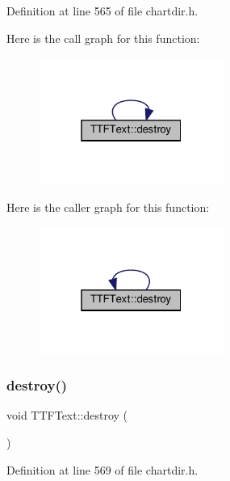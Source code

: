 Definition at line 565 of file chartdir.\+h.

Here is the call graph for this function\+:
\nopagebreak
\begin{figure}[H]
\begin{center}
\leavevmode
\includegraphics[width=172pt]{class_t_t_f_text_ad656abc050a6d082cf0f07fb5c519253_cgraph}
\end{center}
\end{figure}
Here is the caller graph for this function\+:
\nopagebreak
\begin{figure}[H]
\begin{center}
\leavevmode
\includegraphics[width=172pt]{class_t_t_f_text_ad656abc050a6d082cf0f07fb5c519253_icgraph}
\end{center}
\end{figure}
\mbox{\label{class_t_t_f_text_ac5326f4aab2d131d28e22906ec95a793}} 
\subsubsection{\texorpdfstring{destroy()}{destroy()}\hspace{0.1cm}{\footnotesize\ttfamily [2/2]}}
{\footnotesize\ttfamily void T\+T\+F\+Text\+::destroy (\begin{DoxyParamCaption}{ }\end{DoxyParamCaption})\hspace{0.3cm}{\ttfamily [inline]}}



Definition at line 569 of file chartdir.\+h.

